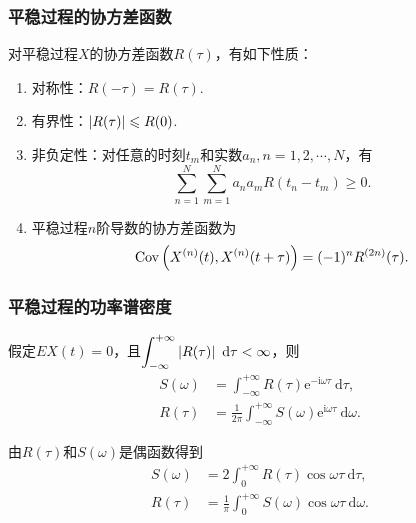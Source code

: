 \begin{frame}
    \frametitle{平稳过程的协方差函数}
    \begin{myproposition}[平稳过程协方差函数的性质]
        对平稳过程$X$的协方差函数$R(\tau)$，有如下性质\footnotemark ：
        \begin{enumerate}
            \item 对称性：$R(-\tau)=R(\tau)$. 
            \item 有界性：$\left\lvert R(\tau)\right\rvert\leqslant R(0)$.
            \item 非负定性：对任意的时刻$t_m$和实数$a_n,n=1,2,\cdots,N$，有
                \begin{equation}
                    \sum_{n=1}^N\sum_{m=1}^Na_na_mR(t_n-t_m)\geqslant 0.
                \end{equation}
            \item 平稳过程$n$阶导数的协方差函数为
                \begin{equation}
                    \mathrm{Cov}\left(X^{(n)}(t),X^{(n)}(t+\tau)\right)=(-1)^nR^{(2n)}(\tau). 
                \end{equation}
        \end{enumerate}
    \end{myproposition}
\end{frame}

\setcounter{footnote}{0}

\begin{frame}
    \frametitle{平稳过程的功率谱密度}
    \begin{mytheorem}\footnotesize
        假定$EX(t)=0$，且$\displaystyle\int_{-\infty}^{+\infty}\abs{R(\tau)}\ \mathrm d\tau<\infty$，则
        \begin{align}
            S(\omega)&=\int_{-\infty}^{+\infty}R(\tau)\mathrm e^{-\mathrm i\omega\tau}\ \mathrm d\tau,\\
            R(\tau)&=\frac1{2\pi}\int_{-\infty}^{+\infty}S(\omega)\mathrm e^{\mathrm i\omega\tau}\ \mathrm d\omega.
        \end{align}
    \end{mytheorem}
    \begin{mycorollary}\footnotesize
        由$R(\tau)$和$S(\omega)$是偶函数得到
        \begin{align}
            S(\omega)&=2\int_0^{+\infty}R(\tau)\cos\omega\tau\ \mathrm d\tau,\\
            R(\tau)&=\frac1{\pi}\int_0^{+\infty}S(\omega)\cos\omega\tau\ \mathrm d\omega. 
        \end{align}
    \end{mycorollary}
\end{frame}

